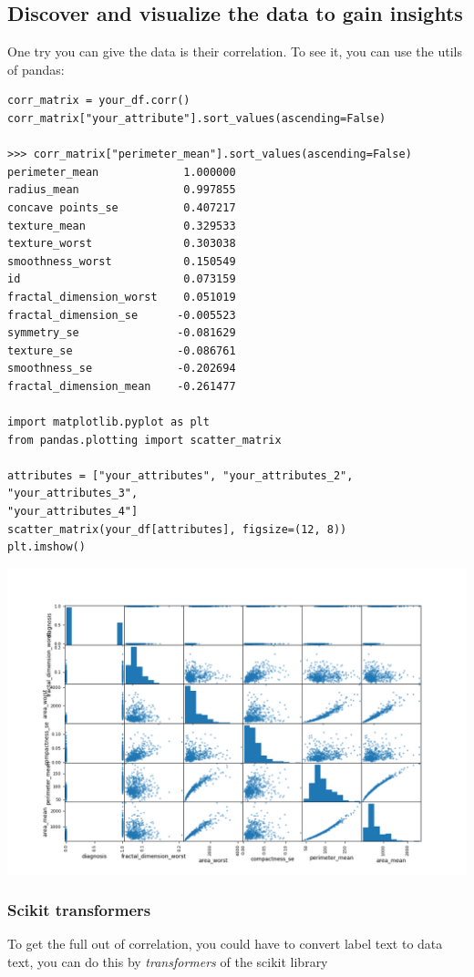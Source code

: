 \documentclass{article}
\begin{document}
\subsection{Discover and visualize the data to gain insights}
One try you can give the data is their correlation. To see it, you can use the utils of pandas:
\begin{lstlisting}
corr_matrix = your_df.corr()
corr_matrix["your_attribute"].sort_values(ascending=False)

>>> corr_matrix["perimeter_mean"].sort_values(ascending=False)
perimeter_mean             1.000000
radius_mean                0.997855
concave points_se          0.407217
texture_mean               0.329533
texture_worst              0.303038
smoothness_worst           0.150549
id                         0.073159
fractal_dimension_worst    0.051019
fractal_dimension_se      -0.005523
symmetry_se               -0.081629
texture_se                -0.086761
smoothness_se             -0.202694
fractal_dimension_mean    -0.261477

import matplotlib.pyplot as plt
from pandas.plotting import scatter_matrix

attributes = ["your_attributes", "your_attributes_2", "your_attributes_3",
"your_attributes_4"]
scatter_matrix(your_df[attributes], figsize=(12, 8))
plt.imshow()
\end{lstlisting}

\includegraphics[scale=0.5]{scatter_matrix_example.png}

\subsubsection{Scikit transformers}
To get the full out of correlation, you could have to convert label text to data text, you can do this by \textit{transformers} of the scikit library
\end{document}
